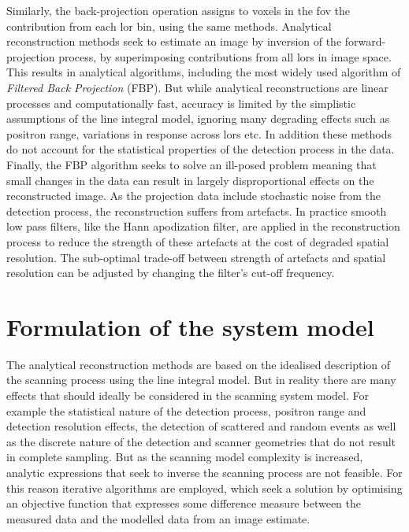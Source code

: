 Similarly, the back-projection operation assigns to voxels in the \gls{fov} the contribution from each \gls{lor} bin, using the same methods.
Analytical reconstruction methods seek to estimate an image by inversion of the forward-projection process, by superimposing contributions from all \glspl{lor} in image space. 
This results in analytical algorithms, including the most widely used algorithm of \textit{Filtered Back Projection} (FBP).
But while analytical reconstructions are linear processes and computationally fast, accuracy is limited by the simplistic assumptions of the line integral model, ignoring many degrading effects such as positron range, variations in response across \glspl{lor} etc. In addition these methods do not account for the statistical properties of the detection process in the data.
Finally, the FBP algorithm seeks to solve an ill-posed problem meaning that small changes in the data can result in largely disproportional effects on the reconstructed image. As the projection data include stochastic noise from the detection process, the reconstruction suffers from artefacts. In practice smooth low pass filters, like the Hann apodization filter, are applied in the reconstruction process to reduce the strength of these artefacts at the cost of degraded spatial resolution. The sub-optimal trade-off between strength of artefacts and spatial resolution can be adjusted by changing the filter's cut-off frequency.

\section{Formulation of the system model}
The analytical reconstruction methods are based on the idealised description of the scanning process using the line integral model. But in reality there are many effects that should ideally be considered in the scanning system model. For example the statistical nature of the detection process, positron range and detection resolution effects, the detection of scattered and random events as well as the discrete nature of the detection and scanner geometries that do not result in complete sampling.
But as the scanning model complexity is increased, analytic expressions that seek to inverse the scanning process are not feasible.
For this reason iterative algorithms are employed, which seek a solution by optimising an objective function that expresses some difference measure between the measured data and the modelled data from an image estimate.

